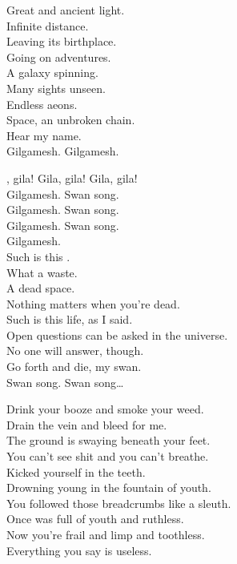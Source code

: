 Great and ancient light. \\
Infinite distance. \\
Leaving its birthplace. \\
Going on adventures. \\
A galaxy spinning. \\
Many sights unseen. \\
Endless aeons. \\
Space, an unbroken chain. \\
Hear my name. \\

Gilgamesh. Gilgamesh. \\


, gila! Gila, gila! Gila, gila! \\

Gilgamesh. Swan song. \\
Gilgamesh. Swan song. \\
Gilgamesh. Swan song. \\

Gilgamesh. \\

Such is this . \\
What a waste. \\
A dead space. \\
Nothing matters when you're dead. \\
Such is this life, as I said. \\
Open questions can be asked in the universe. \\
No one will answer, though. \\
Go forth and die, my swan. \\

Swan song. Swan song… \\



Drink your booze and smoke your weed. \\
Drain the vein and bleed for me. \\
The ground is swaying beneath your feet. \\
You can't see shit and you can't breathe. \\
Kicked yourself in the teeth. \\
Drowning young in the fountain of youth. \\
You followed those breadcrumbs like a sleuth. \\
Once was full of youth and ruthless. \\
Now you're frail and limp and toothless. \\
Everything you say is useless. \\

